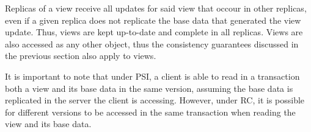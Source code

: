 \documentclass{vldb}
\begin{document}
Replicas of a view receive all updates for said view that occour in other replicas, even if a given replica does not replicate the base data that generated the view update.
Thus, views are kept up-to-date and complete in all replicas.
Views are also accessed as any other object, thus the consistency guarantees discussed in the previous section also apply to views.

It is important to note that under PSI, a client is able to read in a transaction both a view and its base data in the same version, assuming the base data is replicated in the server the client is accessing.
However, under RC, it is possible for different versions to be accessed in the same transaction when reading the view and its base data.



\end{document}
